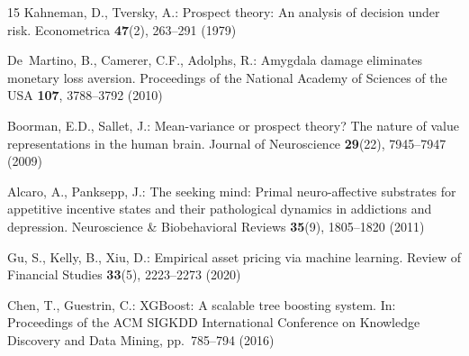\documentclass[runningheads,10pt]{llncs}
\begin{document}
\begin{thebibliography}{15}
Kahneman, D., Tversky, A.: Prospect theory: An analysis of decision under risk. Econometrica \textbf{47}(2), 263--291 (1979)

De~Martino, B., Camerer, C.F., Adolphs, R.: Amygdala damage eliminates monetary loss aversion. Proceedings of the National Academy of Sciences of the USA \textbf{107}, 3788--3792 (2010)

Boorman, E.D., Sallet, J.: Mean-variance or prospect theory? The nature of value representations in the human brain. Journal of Neuroscience \textbf{29}(22), 7945--7947 (2009)

Alcaro, A., Panksepp, J.: The seeking mind: Primal neuro-affective substrates for appetitive incentive states and their pathological dynamics in addictions and depression. Neuroscience \& Biobehavioral Reviews \textbf{35}(9), 1805--1820 (2011)

Gu, S., Kelly, B., Xiu, D.: Empirical asset pricing via machine learning. Review of Financial Studies \textbf{33}(5), 2223--2273 (2020)

Chen, T., Guestrin, C.: XGBoost: A scalable tree boosting system. In: Proceedings of the ACM SIGKDD International Conference on Knowledge Discovery and Data Mining, pp.~785--794 (2016)

\end{thebibliography}
\end{document}
